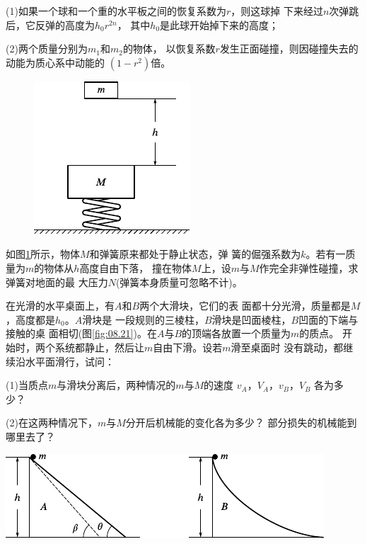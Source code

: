 \begin{exercises}
(1)如果一个球和一个重的水平板之间的恢复系数为$ r $，则这球掉
下来经过$ n $次弹跳后，它反弹的高度为$ h _ { 0 } r ^ { 2 n } $，
其中$ h _ { 0 } $是此球开始掉下来的高度；

\clearpage
(2)两个质量分别为$ m _ { 1 } $和$ m _  { 2 } $的物体，
以恢复系数$ r $发生正面碰撞，则因碰撞失去的动能为质心系中动能的
$ \left( 1 - r ^ { 2 } \right) $倍。

\begin{figure}
  \centering
  \includegraphics{figure/fig08.20}
  \caption{}
  \label{fig:08.20}
\end{figure}
\exercise 如图\ref{fig:08.20}所示，物体$ M $和弹簧原来都处于静止状态，弹
簧的倔强系数为$ k $。若有一质量为$ m $的物体从$ h $高度自由下落，
撞在物体$ M $上，设$ m $与$ M $作完全非弹性碰撞，求弹簧对地面的最
大压力$ N $(弹簧本身质量可忽略不计)。

\exercise 在光滑的水平桌面上，有$ A $和$ B $两个大滑块，它们的表
面都十分光滑，质量都是$ M $，高度都是$ h _ { 0 } $。$ A $滑块是
一段规则的三棱柱，$ B $滑块是凹面棱柱，$ B $凹面的下端与接触的桌
面相切(图\ref{fig:08.21})。在$ A $与$ B $的顶端各放置一个质量为$ m $的质点。
开始时，两个系统都静止，然后让$ m $自由下滑。设若$ m $滑至桌面时
没有跳动，都继续沿水平面滑行，试问：

(1)当质点$ m $与滑块分离后，两种情况的$ m $与$ M $的速度
$ v _ { A } $，$ V _ { A } $，$ v _ { B } $，$ V _ { B } $
各为多少？

(2)在这两种情况下，$ m $与$ M $分开后机械能的变化各为多少？
部分损失的机械能到哪里去了？
\begin{figurex}
  \centering
  \includegraphics{figure/fig08.21}
  \caption{}
  \label{fig:08.21}
\end{figurex}


\end{exercises}
